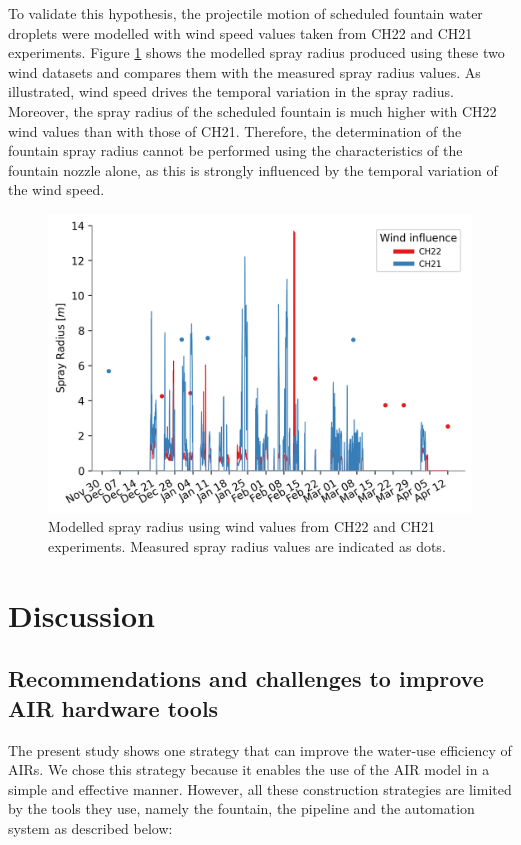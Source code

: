 \documentclass[tc, manuscript]{copernicus}
\begin{document}
To validate this hypothesis, the projectile motion of scheduled fountain water droplets were modelled with wind
speed values taken from CH22 and CH21 experiments. Figure \ref{fig:wind} shows the modelled spray radius
produced using these two wind datasets and compares them with the measured spray radius values. As illustrated,
wind speed drives the temporal variation in the spray radius. Moreover, the spray radius of the scheduled
fountain is much higher with CH22 wind values than with those of CH21. Therefore, the determination of the
fountain spray radius cannot be performed using the characteristics of the fountain nozzle alone, as this is
strongly influenced by the temporal variation of the wind speed.

\begin{figure}[htb]
\includegraphics[width=12 cm]{Figures/radf.png}
\caption{Modelled spray radius using wind values from CH22 and CH21 experiments. Measured spray radius values are
indicated as dots.}
\label{fig:wind}
\end{figure}

\section{Discussion}

\subsection{Recommendations and challenges to improve AIR hardware tools}

The present study shows one strategy that can improve the water-use efficiency of AIRs. We chose this strategy
because it enables the use of the AIR model in a simple and effective manner. However, all these construction
strategies are limited by the tools they use, namely the fountain, the pipeline and the automation system as
described below:
\end{document}
